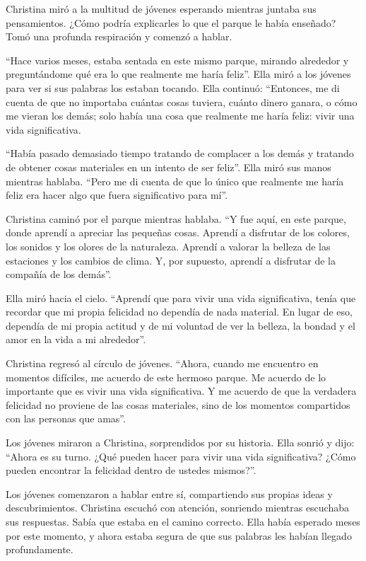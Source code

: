  

Christina miró a la multitud de jóvenes esperando mientras juntaba sus pensamientos. ¿Cómo podría explicarles lo que el parque le había enseñado? Tomó una profunda respiración y comenzó a hablar.

“Hace varios meses, estaba sentada en este mismo parque, mirando alrededor y preguntándome qué era lo que realmente me haría feliz”. Ella miró a los jóvenes para ver si sus palabras los estaban tocando. Ella continuó: “Entonces, me di cuenta de que no importaba cuántas cosas tuviera, cuánto dinero ganara, o cómo me vieran los demás; solo había una cosa que realmente me haría feliz: vivir una vida significativa.

“Había pasado demasiado tiempo tratando de complacer a los demás y tratando de obtener cosas materiales en un intento de ser feliz”. Ella miró sus manos mientras hablaba. “Pero me di cuenta de que lo único que realmente me haría feliz era hacer algo que fuera significativo para mí”.

Christina caminó por el parque mientras hablaba. “Y fue aquí, en este parque, donde aprendí a apreciar las pequeñas cosas. Aprendí a disfrutar de los colores, los sonidos y los olores de la naturaleza. Aprendí a valorar la belleza de las estaciones y los cambios de clima. Y, por supuesto, aprendí a disfrutar de la compañía de los demás”.

Ella miró hacia el cielo. “Aprendí que para vivir una vida significativa, tenía que recordar que mi propia felicidad no dependía de nada material. En lugar de eso, dependía de mi propia actitud y de mi voluntad de ver la belleza, la bondad y el amor en la vida a mi alrededor”.

Christina regresó al círculo de jóvenes. “Ahora, cuando me encuentro en momentos difíciles, me acuerdo de este hermoso parque. Me acuerdo de lo importante que es vivir una vida significativa. Y me acuerdo de que la verdadera felicidad no proviene de las cosas materiales, sino de los momentos compartidos con las personas que amas”.

Los jóvenes miraron a Christina, sorprendidos por su historia. Ella sonrió y dijo: “Ahora es su turno. ¿Qué pueden hacer para vivir una vida significativa? ¿Cómo pueden encontrar la felicidad dentro de ustedes mismos?”.

Los jóvenes comenzaron a hablar entre sí, compartiendo sus propias ideas y descubrimientos. Christina escuchó con atención, sonriendo mientras escuchaba sus respuestas. Sabía que estaba en el camino correcto. Ella había esperado meses por este momento, y ahora estaba segura de que sus palabras les habían llegado profundamente.